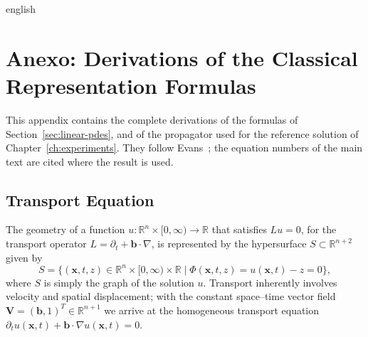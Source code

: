 \documentclass[../0000.tex]{subfiles}
\begin{document}

\begin{hyphenrules}{english}

\chapter{Anexo: Derivations of the Classical Representation Formulas}\label{app:classical}

This appendix contains the complete derivations of the formulas of Section~\ref{sec:linear-pdes}, and of
the propagator used for the reference solution of Chapter~\ref{ch:experiments}. They follow
Evans~\cite{evans2010}; the equation numbers of the main text are cited where the result is used.

\section{Transport Equation}\label{app-sec:transport}

The geometry of a function $u:\mathbb{R}^n\times[0,\infty)\to\mathbb{R}$ that satisfies $Lu=0$, for the transport
operator $L=\partial_t+\mathbf{b}\cdot\nabla$, is represented by the hypersurface $S\subset\mathbb{R}^{n+2}$ given by
\begin{equation}
  S=\{(\mathbf{x},t,z)\in\mathbb{R}^n\times[0,\infty)\times\mathbb{R} \mid \Phi(\mathbf{x},t,z)=u(\mathbf{x},t)-z=0\},
  \label{eq:transport-graph}
\end{equation}
where $S$ is simply the graph of the solution $u$. Transport inherently involves velocity and spatial
displacement; with the constant space--time vector field $\mathbf{V}=(\mathbf{b},1)^{T}\in\mathbb{R}^{n+1}$ we arrive at
the homogeneous transport equation $\partial_t u(\mathbf{x},t)+\mathbf{b}\cdot\nabla u(\mathbf{x},t)=0$.


\end{hyphenrules}
\end{document}
